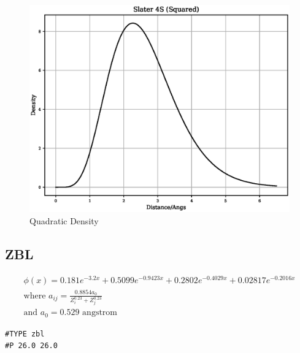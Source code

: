 \FloatBarrier
\begin{figure}[h]
  \begin{center}
    \includegraphics[scale=0.5]{appendix/functions/plots/slater_4s.eps}
    \caption{Quadratic Density}
    \label{graph:graph1}
  \end{center}
\end{figure}
\FloatBarrier







\subsection{ZBL}

\begin{equation}
\begin{split}
\phi(x) = 0.181 e^{-3.2x} + 0.5099 e^{-0.9423x} + 0.2802 e^{-0.4029x} + 0.02817 e^{-0.2016x} \\
\text{where } a_{ij} = \frac{0.8854 a_0}{Z^{0.23}_i + Z^{0.23}_j} \\
\text{and } a_0 = 0.529 \text{ angstrom}
\end{split}
\label{eq:ZBL}
\end{equation}

\begin{lstlisting}[style=pseudocode,caption={ZBL}]
#TYPE zbl
#P 26.0 26.0
\end{lstlisting}

